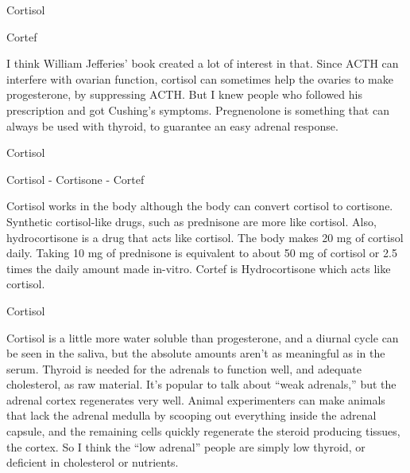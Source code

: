 \documentclass[11pt,oneside,openany,extrafontsizes]{memoir}
\begin{document}
\begin{standalonequote}{Cortisol}
    \begin{note}
        Cortef
    \end{note}

    \begin{answer}
        I think William Jefferies' book created a lot of interest in that. Since ACTH can interfere with ovarian function, cortisol can sometimes help the ovaries to make progesterone, by suppressing ACTH. But I knew people who followed his prescription and got Cushing's symptoms. Pregnenolone is something that can always be used with thyroid, to guarantee an easy adrenal response.
    \end{answer}
\end{standalonequote}

\begin{standalonequote}{Cortisol}
    \begin{note}
        Cortisol - Cortisone - Cortef
    \end{note}

    \begin{answer}
        Cortisol works in the body although the body can convert cortisol to cortisone. Synthetic cortisol-like drugs, such as prednisone are more like cortisol. Also, hydrocortisone is a drug that acts like cortisol. The body makes 20 mg of cortisol daily. Taking 10 mg of prednisone is equivalent to about 50 mg of cortisol or 2.5 times the daily amount made in-vitro. Cortef is Hydrocortisone which acts like cortisol.
    \end{answer}
\end{standalonequote}

\begin{standalonequote}{Cortisol}

    \begin{answer}
        Cortisol is a little more water soluble than progesterone, and a diurnal cycle can be seen in the saliva, but the absolute amounts aren't as meaningful as in the serum. Thyroid is needed for the adrenals to function well, and adequate cholesterol, as raw material. It's popular to talk about \enquote{weak adrenals,} but the adrenal cortex regenerates very well. Animal experimenters can make animals that lack the adrenal medulla by scooping out everything inside the adrenal capsule, and the remaining cells quickly regenerate the steroid producing tissues, the cortex. So I think the \enquote{low adrenal} people are simply low thyroid, or deficient in cholesterol or nutrients.
    \end{answer}
\end{standalonequote}
\end{document}
